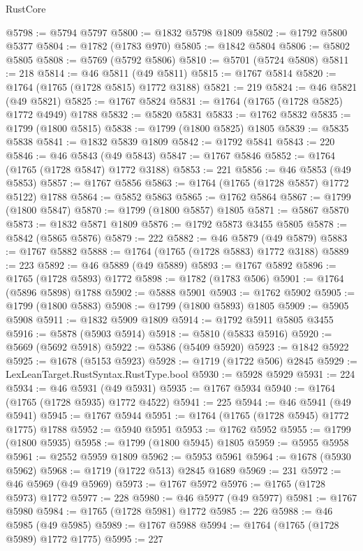 \begin{lexlean}{RustCore}
\begin{coremodule}
@5798 := @5794 @5797
@5800 := @1832 @5798 @1809
@5802 := @1792 @5800 @5377
@5804 := @1782 (@1783 @970)
@5805 := @1842 @5804
@5806 := @5802 @5805
@5808 := @5769 (@5792 @5806)
@5810 := @5701 (@5724 @5808)
@5811 := 218
@5814 := @46 @5811 (@49 @5811)
@5815 := @1767 @5814
@5820 := @1764 (@1765 (@1728 @5815) @1772 @3188)
@5821 := 219
@5824 := @46 @5821 (@49 @5821)
@5825 := @1767 @5824
@5831 := @1764 (@1765 (@1728 @5825) @1772 @4949) @1788
@5832 := @5820 @5831
@5833 := @1762 @5832
@5835 := @1799 (@1800 @5815)
@5838 := @1799 (@1800 @5825) @1805
@5839 := @5835 @5838
@5841 := @1832 @5839 @1809
@5842 := @1792 @5841
@5843 := 220
@5846 := @46 @5843 (@49 @5843)
@5847 := @1767 @5846
@5852 := @1764 (@1765 (@1728 @5847) @1772 @3188)
@5853 := 221
@5856 := @46 @5853 (@49 @5853)
@5857 := @1767 @5856
@5863 := @1764 (@1765 (@1728 @5857) @1772 @5122) @1788
@5864 := @5852 @5863
@5865 := @1762 @5864
@5867 := @1799 (@1800 @5847)
@5870 := @1799 (@1800 @5857) @1805
@5871 := @5867 @5870
@5873 := @1832 @5871 @1809
@5876 := @1792 @5873 @3455 @5805
@5878 := @5842 (@5865 @5876)
@5879 := 222
@5882 := @46 @5879 (@49 @5879)
@5883 := @1767 @5882
@5888 := @1764 (@1765 (@1728 @5883) @1772 @3188)
@5889 := 223
@5892 := @46 @5889 (@49 @5889)
@5893 := @1767 @5892
@5896 := @1765 (@1728 @5893) @1772
@5898 := @1782 (@1783 @506)
@5901 := @1764 (@5896 @5898) @1788
@5902 := @5888 @5901
@5903 := @1762 @5902
@5905 := @1799 (@1800 @5883)
@5908 := @1799 (@1800 @5893) @1805
@5909 := @5905 @5908
@5911 := @1832 @5909 @1809
@5914 := @1792 @5911 @5805 @3455
@5916 := @5878 (@5903 @5914)
@5918 := @5810 (@5833 @5916)
@5920 := @5669 (@5692 @5918)
@5922 := @5386 (@5409 @5920)
@5923 := @1842 @5922
@5925 := @1678 (@5153 @5923)
@5928 := @1719 (@1722 @506) @2845
@5929 := LexLeanTarget.RustSyntax.RustType.bool
@5930 := @5928 @5929
@5931 := 224
@5934 := @46 @5931 (@49 @5931)
@5935 := @1767 @5934
@5940 := @1764 (@1765 (@1728 @5935) @1772 @4522)
@5941 := 225
@5944 := @46 @5941 (@49 @5941)
@5945 := @1767 @5944
@5951 := @1764 (@1765 (@1728 @5945) @1772 @1775) @1788
@5952 := @5940 @5951
@5953 := @1762 @5952
@5955 := @1799 (@1800 @5935)
@5958 := @1799 (@1800 @5945) @1805
@5959 := @5955 @5958
@5961 := @2552 @5959 @1809
@5962 := @5953 @5961
@5964 := @1678 (@5930 @5962)
@5968 := @1719 (@1722 @513) @2845 @1689
@5969 := 231
@5972 := @46 @5969 (@49 @5969)
@5973 := @1767 @5972
@5976 := @1765 (@1728 @5973) @1772
@5977 := 228
@5980 := @46 @5977 (@49 @5977)
@5981 := @1767 @5980
@5984 := @1765 (@1728 @5981) @1772
@5985 := 226
@5988 := @46 @5985 (@49 @5985)
@5989 := @1767 @5988
@5994 := @1764 (@1765 (@1728 @5989) @1772 @1775)
@5995 := 227

\end{coremodule}
\end{lexlean}
